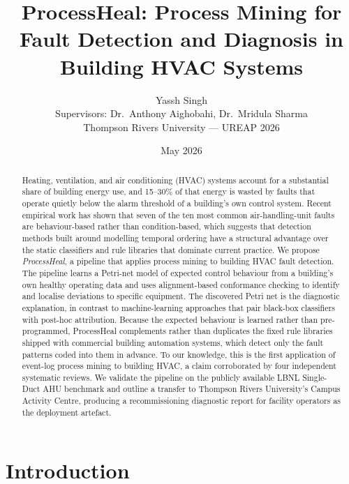 \documentclass[11pt,letterpaper]{article}
\title{ProcessHeal: Process Mining for Fault Detection and Diagnosis in Building HVAC Systems}
\author{Yassh Singh \\
\small Supervisors: Dr.\ Anthony Aighobahi, Dr.\ Mridula Sharma \\
\small Thompson Rivers University --- UREAP 2026}
\date{May 2026}
\begin{document}
\maketitle

\begin{abstract}
\noindent
Heating, ventilation, and air conditioning (HVAC) systems account for a substantial share of building energy use, and 15--30\% of that energy is wasted by faults that operate quietly below the alarm threshold of a building's own control system. Recent empirical work has shown that seven of the ten most common air-handling-unit faults are behaviour-based rather than condition-based, which suggests that detection methods built around modelling temporal ordering have a structural advantage over the static classifiers and rule libraries that dominate current practice. We propose \emph{ProcessHeal}, a pipeline that applies process mining to building HVAC fault detection. The pipeline learns a Petri-net model of expected control behaviour from a building's own healthy operating data and uses alignment-based conformance checking to identify and localise deviations to specific equipment. The discovered Petri net is the diagnostic explanation, in contrast to machine-learning approaches that pair black-box classifiers with post-hoc attribution. Because the expected behaviour is learned rather than pre-programmed, ProcessHeal complements rather than duplicates the fixed rule libraries shipped with commercial building automation systems, which detect only the fault patterns coded into them in advance. To our knowledge, this is the first application of event-log process mining to building HVAC, a claim corroborated by four independent systematic reviews. We validate the pipeline on the publicly available LBNL Single-Duct AHU benchmark and outline a transfer to Thompson Rivers University's Campus Activity Centre, producing a recommissioning diagnostic report for facility operators as the deployment artefact.
\end{abstract}

\section{Introduction}
\end{document}
